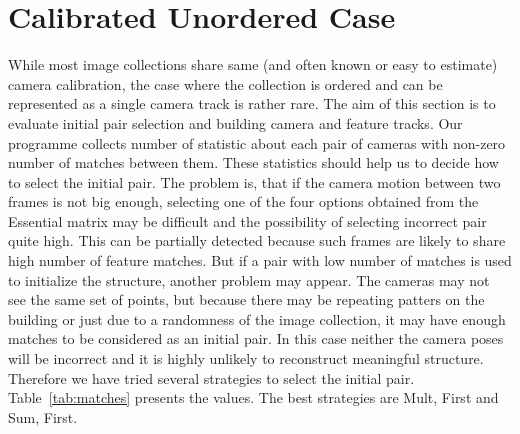 \section{Calibrated Unordered Case}
\label{sec:experiments-calibrated}
While most image collections share same (and often known or easy to estimate) camera calibration, the case where the collection is ordered and can be represented as a single camera track is rather rare. The aim of this section is to evaluate initial pair selection and building camera and feature tracks. Our programme collects number of statistic about each pair of cameras with non-zero number of matches between them. These statistics should help us to decide how to select the initial pair. The problem is, that if the camera motion between two frames is not big enough, selecting one of the four options obtained from the Essential matrix may be difficult and the possibility of selecting incorrect pair quite high. This can be partially detected because such frames are likely to share high number of feature matches. But if a pair with low number of matches is used to initialize the structure, another problem may appear. The cameras may not see the same set of points, but because there may be repeating patters on the building or just due to a randomness of the image collection, it may have enough matches to be considered as an initial pair. In this case neither the camera poses will be incorrect and it is highly unlikely to reconstruct meaningful structure. Therefore we have tried several strategies to select the initial pair. Table~\ref{tab:matches} presents the values. The best strategies are Mult, First and Sum, First.

